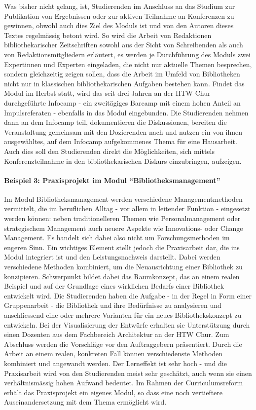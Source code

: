 \documentclass[a4paper,
fontsize=11pt,
oneside,
numbers=noperiodatend,
parskip=half-,
bibliography=totoc,
final
]{scrartcl}
\begin{document}
Was bisher nicht gelang, ist, Studierenden im Anschluss an das Studium
zur Publikation von Ergebnissen oder zur aktiven Teilnahme an
Konferenzen zu gewinnen, obwohl auch dies Ziel des Moduls ist und von
den Autoren dieses Textes regelmässig betont wird. So wird die Arbeit
von Redaktionen bibliothekarischer Zeitschriften sowohl aus der Sicht
von Schreibenden als auch von Redaktionsmitgliedern erläutert, es werden
je Durchführung des Moduls zwei Expertinnen und Experten eingeladen, die
nicht nur aktuelle Themen besprechen, sondern gleichzeitig zeigen
sollen, dass die Arbeit im Umfeld von Bibliotheken nicht nur in
klassischen bibliothekarischen Aufgaben bestehen kann. Findet das Modul
im Herbst statt, wird das seit drei Jahren an der HTW Chur durchgeführte
Infocamp - ein zweitägiges Barcamp mit einem hohen Anteil an
Impulsreferaten - ebenfalls in das Modul eingebunden. Die Studierenden
nehmen dann an dem Infocamp teil, dokumentieren die Diskussionen,
bereiten die Veranstaltung gemeinsam mit den Dozierenden nach und nutzen
ein von ihnen ausgewähltes, auf dem Infocamp aufgekommenes Thema für
eine Hausarbeit. Auch dies soll den Studierenden direkt die
Möglichkeiten, sich mittels Konferenzteilnahme in den bibliothekarischen
Diskurs einzubringen, aufzeigen.

\paragraph{Beispiel 3: Praxisprojekt im Modul
\enquote{Bibliotheksmanagement}}\label{beispiel-3-praxisprojekt-im-modul-bibliotheksmanagement}

Im Modul Bibliotheksmanagement werden verschiedene Managementmethoden
vermittelt, die im beruflichen Alltag - vor allem in leitender Funktion
- eingesetzt werden können: neben traditionelleren Themen wie
Personalmanagement oder strategischem Management auch neuere Aspekte wie
Innovations- oder Change Management. Es handelt sich dabei also nicht um
Forschungsmethoden im engeren Sinn. Ein wichtiges Element stellt jedoch
die Praxisarbeit dar, die ins Modul integriert ist und den
Leistungsnachweis darstellt. Dabei werden verschiedene Methoden
kombiniert, um die Neuausrichtung einer Bibliothek zu konzipieren.
Schwerpunkt bildet dabei das Raumkonzept, das an einem realen Beispiel
und auf der Grundlage eines wirklichen Bedarfs einer Bibliothek
entwickelt wird. Die Studierenden haben die Aufgabe - in der Regel in
Form einer Gruppenarbeit - die Bibliothek und ihre Bedürfnisse zu
analysieren und anschliessend eine oder mehrere Varianten für ein neues
Bibliothekskonzept zu entwickeln. Bei der Visualisierung der Entwürfe
erhalten sie Unterstützung durch einen Dozenten aus dem Fachbereich
Architektur an der HTW Chur. Zum Abschluss werden die Vorschläge vor den
Auftraggebern präsentiert. Durch die Arbeit an einem realen, konkreten
Fall können verschiedenste Methoden kombiniert und angewandt werden. Der
Lerneffekt ist sehr hoch - und die Praxisarbeit wird von den
Studierenden meist sehr geschätzt, auch wenn sie einen verhältnismässig
hohen Aufwand bedeutet. Im Rahmen der Curriculumsreform erhält das
Praxisprojekt ein eigenes Modul, so dass eine noch vertieftere
Auseinandersetzung mit dem Thema ermöglicht wird.
\end{document}

